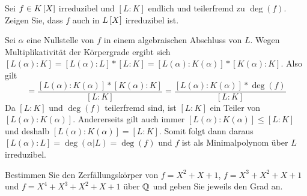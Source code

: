 \begin{exercisePage}
	\setcounter{taskcount}{22}
	
	\begin{homework}
		Sei $f \in \polynom[K]$ irreduzibel und $[L : K]$ endlich und teilerfremd zu $\deg(f)$. Zeigen Sie, dass $f$ auch in $\polynom[L]$ irreduzibel ist.
	\end{homework}

	Sei $\alpha$ eine Nullstelle von $f$ in einem algebraischen Abschluss von $L$. Wegen Multiplikativität der Körpergrade ergibt sich $[L(\alpha) : K] = [L(\alpha) : L] * [L : K] = [L(\alpha) : K(\alpha)] * [K(\alpha) : K]$. Also gilt
	\begin{equation*}
		[L(\alpha) : L] = \frac{[L(\alpha) : K(\alpha)] * [K(\alpha) : K]}{[L : K]} = \frac{[L(\alpha) : K(\alpha)] * \deg(f)}{[L : K]}
	\end{equation*} 
	Da $[L:K]$ und $\deg(f)$ teilerfremd sind, ist $[L:K]$ ein Teiler von $[L(\alpha) : K(\alpha)]$. Andererseits gilt auch immer $[L(\alpha) : K(\alpha)] \leq [L:K]$ und deshalb $[L(\alpha) : K(\alpha)] = [L:K]$.  Somit folgt dann daraus $[L(\alpha) : L] = \deg(\alpha|L) = \deg(f)$ und $f$ ist als Minimalpolynom über $L$ irreduzibel.
	
	
	\begin{homework}
		Bestimmen Sie den Zerfällungskörper von $f = X^2 + X + 1$, $f = X^3 + X^2 + X + 1$ und $f = X^4 + X^3 + X^2 + X + 1$ über $\mathbb{Q}$ und geben Sie jeweils den Grad an.
	\end{homework}
	

\end{exercisePage}
